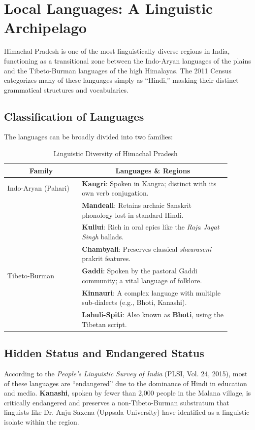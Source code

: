 \documentclass[12pt]{article}
\begin{document}
\section{Local Languages: A Linguistic Archipelago}
Himachal Pradesh is one of the most linguistically diverse regions in India, functioning as a transitional zone between the Indo-Aryan languages of the plains and the Tibeto-Burman languages of the high Himalayas. The 2011 Census categorizes many of these languages simply as “Hindi,” masking their distinct grammatical structures and vocabularies.

\subsection{Classification of Languages}
The languages can be broadly divided into two families:

\begin{table}[h!]
\centering
\begin{tabular}{|p{0.3\linewidth}|p{0.6\linewidth}|}
\hline
\multicolumn{1}{|c|}{\textbf{Family}} & \multicolumn{1}{c|}{\textbf{Languages \& Regions}} \\
\hline
Indo-Aryan (Pahari) & \textbf{Kangri}: Spoken in Kangra; distinct with its own verb conjugation. \\
& \textbf{Mandeali}: Retains archaic Sanskrit phonology lost in standard Hindi. \\
& \textbf{Kullui}: Rich in oral epics like the \textit{Raja Jagat Singh} ballads. \\
& \textbf{Chambyali}: Preserves classical \textit{shauraseni} prakrit features. \\
\hline
Tibeto-Burman & \textbf{Gaddi}: Spoken by the pastoral Gaddi community; a vital language of folklore. \\
& \textbf{Kinnauri}: A complex language with multiple sub-dialects (e.g., Bhoti, Kanashi). \\
& \textbf{Lahuli-Spiti}: Also known as \textbf{Bhoti}, using the Tibetan script. \\
\hline
\end{tabular}
\caption{Linguistic Diversity of Himachal Pradesh}
\end{table}

\subsection{Hidden Status and Endangered Status}
According to the \textit{People’s Linguistic Survey of India} (PLSI, Vol. 24, 2015), most of these languages are “endangered” due to the dominance of Hindi in education and media. \textbf{Kanashi}, spoken by fewer than 2,000 people in the Malana village, is critically endangered and preserves a non-Tibeto-Burman substratum that linguists like Dr. Anju Saxena (Uppsala University) have identified as a linguistic isolate within the region.
\end{document}
